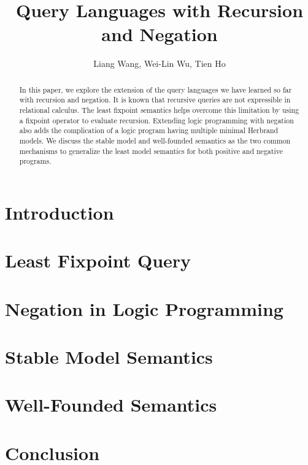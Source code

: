 \documentclass[11pt]{article}
\begin{document}
\title{Query Languages with Recursion and Negation}
\author{Liang Wang, Wei-Lin Wu, Tien Ho}
\maketitle

\begin{abstract}
  \noindent In this paper, we explore the extension of the query languages we have 
  learned so far with recursion and negation. It is known that 
  recursive queries are not expressible in relational calculus. The least 
  fixpoint semantics helps overcome this limitation by using a fixpoint 
  operator to evaluate recursion. Extending logic programming with negation 
  also adds the complication of a logic program having multiple minimal 
  Herbrand models. We discuss the stable model and well-founded semantics 
  as the two common mechanisms to generalize the least model semantics 
  for both positive and negative programs. 
\end{abstract}

\section{Introduction} 
\section{Least Fixpoint Query} 
\section{Negation in Logic Programming} 
\section{Stable Model Semantics} 
\section{Well-Founded Semantics} 
\section{Conclusion} 
\end{document}
